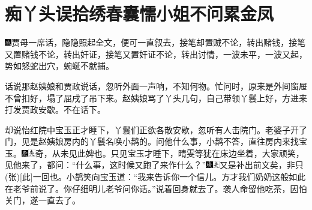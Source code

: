 \chapter{痴丫头误拾绣春囊\hspace{.5em}懦小姐不问累金凤}
{\includegraphics[width=3mm]{../Images/00005}\kaishu 贾母一席话，隐隐照起全文，便可一直叙去，接笔却置贼不论，转出赌钱，接笔又置赌钱不论，转出奸证，接笔又置奸证不论，转出讨情，一波未平，一波又起，势如怒蛇出穴，蜿蜒不就捕。}

话说那赵姨娘和贾政说话，忽听外面一声响，不知何物。忙问时，原来是外间窗屉不曾扣好，塌了屈戌了吊下来。赵姨娘骂了丫头几句，自己带领丫鬟上好，方进来打发贾政安歇。不在话下。

却说怡红院中宝玉正才睡下，丫鬟们正欲各散安歇，忽听有人击院门。老婆子开了门，见是赵姨娘房内的丫鬟名唤小鹊的。问他什么事，小鹊不答，直往房内来找宝玉。{\includegraphics[width=3mm]{../Images/00004}\includegraphics[width=3mm]{../Images/00012}\footnotesize \kaishu 奇，从未见此婢也。}只见宝玉才睡下，晴雯等犹在床边坐着，大家顽笑，见他来了，都问：“什么事，这时候又跑了来作什么？”{\includegraphics[width=3mm]{../Images/00004}\includegraphics[width=3mm]{../Images/00012}\footnotesize \kaishu 又是补出前文矣，非只{(张)}{[}此{]}一回也。}小鹊笑向宝玉道：“我来告诉你一个信儿。方才我们奶奶这般如此在老爷前说了。你仔细明儿老爷问你话。”说着回身就去了。袭人命留他吃茶，因怕关门，遂一直去了。

